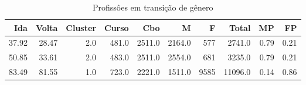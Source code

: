 \begin{table}
\centering
\caption{Profissôes em transição de gênero}
\label{tab:Salarios_transicao}
\begin{tabular}{rrrrrrrrrr}
\toprule
  Ida &  Volta &  Cluster &  Curso &    Cbo &      M &    F &   Total &   MP &   FP \\
\midrule
37.92 &  28.47 &      2.0 &  481.0 & 2511.0 & 2164.0 &  577 &  2741.0 & 0.79 & 0.21 \\
50.85 &  33.61 &      2.0 &  483.0 & 2511.0 & 2554.0 &  681 &  3235.0 & 0.79 & 0.21 \\
83.49 &  81.55 &      1.0 &  723.0 & 2221.0 & 1511.0 & 9585 & 11096.0 & 0.14 & 0.86 \\
\bottomrule
\end{tabular}
\end{table}
